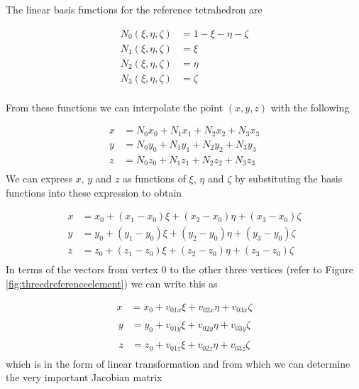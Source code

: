 \documentclass[11pt,letterpaper,titlepage]{article}
\newcommand{\beq}{\begin{equation*}
\begin{aligned}}
\newcommand{\eeq}{\end{aligned}
\end{equation*}}
\newcommand{\beqn}{\begin{equation}
	\begin{aligned}}
\newcommand{\eeqn}{\end{aligned}
	\end{equation}}
\begin{document}
The linear basis functions for the reference tetrahedron are

\beq 
N_0(\xi,\eta,\zeta) &= 1 - \xi - \eta - \zeta \\
N_1(\xi,\eta,\zeta) &= \xi \\
N_2(\xi,\eta,\zeta) &= \eta \\
N_3(\xi,\eta,\zeta) &= \zeta \\
\eeq 

From these functions we can interpolate the point $(x,y,z)$ with the following

\beq 
x &= N_0 x_0 + N_1 x_1 + N_2 x_2 + N_3 x_3 \\
y &= N_0 y_0 + N_1 y_1 + N_2 y_2 + N_3 y_3 \\
z &= N_0 z_0 + N_1 z_1 + N_2 z_2 + N_3 z_3 \\
\eeq 
\newline
We can express $x$, $y$ and $z$ as functions of $\xi$, $\eta$ and $\zeta$ by substituting the basis functions into these expression to obtain

\beq 
x &= x_0 + (x_1-x_0)\xi + (x_2-x_0)\eta + (x_3-x_0)\zeta \\
y &= y_0 + (y_1-y_0)\xi + (y_2-y_0)\eta + (y_3-y_0)\zeta \\
z &= z_0 + (z_1-z_0)\xi + (z_2-z_0)\eta + (z_3-z_0)\zeta \\
\eeq 
\newline
In terms of the vectors from vertex $0$ to the other three vertices (refer to Figure \ref{fig:threedreferenceelement}) we can write this as

\beqn 
x &= x_0 + v_{01x}\xi + v_{02x}\eta + v_{03x}\zeta \\
\eeqn 
\beqn 
y &= y_0 + v_{01y}\xi + v_{02y}\eta + v_{03y}\zeta \\
\eeqn 
\beqn 
z &= z_0 + v_{01z}\xi + v_{02z}\eta + v_{03z}\zeta \\
\eeqn 
\newline
which is in the form of linear transformation and from which we can determine the very important Jacobian matrix
\end{document}
